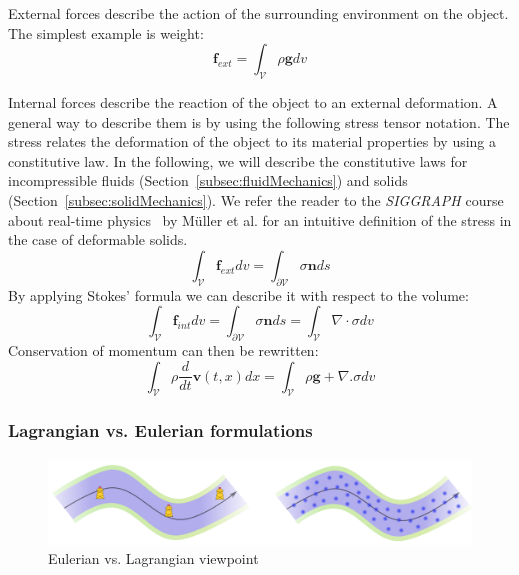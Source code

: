 External forces describe the action of the surrounding environment on the object. 
The simplest example is weight:
\begin{equation}
\displaystyle \mathbf{f}_{ext} = \int_{\mathcal{V}} \rho \mathbf{g} dv
\end{equation}

Internal forces describe the reaction of the object to an external deformation. A general way to describe them is by using the following stress tensor notation.
The stress relates the deformation of the object to its material properties by using a constitutive law.
In the following, we will describe the constitutive laws for incompressible fluids (Section~\ref{subsec:fluidMechanics}) and solids (Section~\ref{subsec:solidMechanics}).
We refer the reader to the \emph{SIGGRAPH} course about real-time physics~\cite{Muller2008} by M\"{u}ller et al. for an intuitive definition of the stress in the case of deformable solids.
\begin{equation}
\displaystyle \int_{\mathcal{V}} \mathbf{f}_{ext} dv = \int_{\partial \mathcal{V}} \sigma \mathbf{n} ds
\end{equation}
By applying Stokes' formula we can describe it with respect to the volume:
\begin{equation}
\displaystyle 
\int_{\mathcal{V}} \mathbf{f}_{int} dv = \int_{\mathcal{\partial V}} \sigma \mathbf{n} ds =
\int_{\mathcal{V}} \nabla \cdot \sigma dv
\end{equation}
Conservation of momentum can then be rewritten:
\begin{equation}
\label{eq:volumetricMomentumConservation}
\displaystyle
\int_{\mathcal{V}} \rho \frac{d}{dt} \mathbf{v}(t,x) dx = \int_{\mathcal{V}} \rho \mathbf{g} + \nabla. \sigma dv
\end{equation}

\subsubsection{Lagrangian vs. Eulerian formulations}

\begin{figure}[!ht]
\centering
\includegraphics[scale=0.5]{images/continuum_mechanics/eulerianVsLagrangian.png}
\caption[STAR mechanics: Eulerian vs. Lagrangian]{\label{fig:EulerianVsLagrangian} Eulerian vs. Lagrangian viewpoint}
\end{figure}

